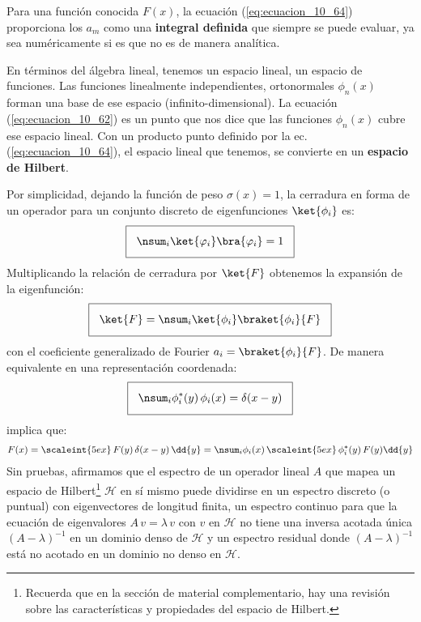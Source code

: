 \par
Para una función conocida $F (x)$, la ecuación (\ref{eq:ecuacion_10_64}) proporciona los $a_{m}$ como una \textbf{integral definida} que siempre se puede evaluar, ya sea numéricamente si es que no es de manera analítica.
\par
En términos del álgebra lineal, tenemos un espacio lineal, un espacio de funciones. Las funciones linealmente independientes, ortonormales $\phi_{n} (x)$ forman una base de ese espacio (infinito-dimensional). La ecuación (\ref{eq:ecuacion_10_62}) es un punto que nos dice que las funciones $\phi_{n} (x)$ cubre ese espacio lineal. Con un producto punto definido por la ec. (\ref{eq:ecuacion_10_64}), el espacio lineal que tenemos, se convierte en un \textbf{espacio de Hilbert}.
\par
Por simplicidad, dejando la función de peso $\sigma (x) = 1$, la cerradura en forma de un operador para un conjunto discreto de eigenfunciones $\ket{\phi_{i}}$ es:
\begin{align*}
\setlength{\fboxsep}{3\fboxsep}\boxed{
\nsum_{i} \ket{\varphi_{i}} \bra{\varphi_{i}} =  1}
\end{align*}
Multiplicando la relación de cerradura por $\ket{F}$ obtenemos la expansión de la eigenfunción:
\begin{align*}
\setlength{\fboxsep}{3\fboxsep}\boxed{
\ket{F} = \nsum_{i} \ket{\phi_{i}} \braket{\phi_{i}}{F}}
\end{align*}
con el coeficiente generalizado de Fourier $a_{i} = \braket{\phi_{i}}{F}$. De manera equivalente en una representación coordenada:
\begin{align*}
\setlength{\fboxsep}{3\fboxsep}\boxed{
\nsum_{i} \phi_{i}^{*} (y) \, \phi_{i} (x) = \delta (x - y)}
\end{align*}
implica que:
\begin{align*}
F(x) = \scaleint{5ex} \, F(y) \, \delta (x - y) \, \dd{y} = \nsum_{i} \phi_{i} (x) \, \scaleint{5ex} \, \phi_{i}^{*} (y) \, F(y) \dd{y}
\end{align*}
Sin pruebas, afirmamos que el espectro de un operador lineal $A$ que mapea un espacio de Hilbert\footnote{Recuerda que en la sección de material complementario, hay una revisión sobre las características y propiedades del espacio de Hilbert.} $\mathcal{H}$ en sí mismo puede dividirse en un espectro discreto (o puntual) con eigenvectores de longitud finita, un espectro continuo para que la ecuación de eigenvalores $A \, v = \lambda \, v$ con $v$ en $\mathcal{H}$ no tiene una inversa acotada única $(A - \lambda)^{-1}$ en un dominio denso de $\mathcal{H}$ y un espectro residual donde $(A - \lambda)^{-1}$ está no acotado en un dominio no denso en $\mathcal{H}$.

